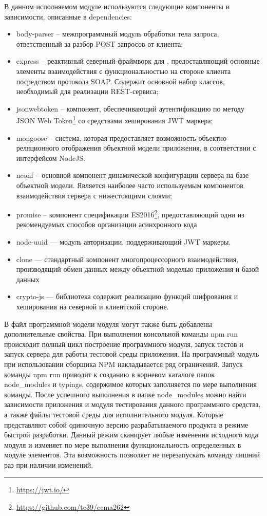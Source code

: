 В данном исполняемом модуле используются следующие компоненты и зависимости, описанные в dependencies:
\begin{itemize}
  \item body-parser – межпрограммный модуль обработки тела запроса, ответственный за разбор POST запросов от клиента;
  \item express – реактивный северный-фраймворк для \nodejs{}, предоставляющий основные элементы взаимодействия с функциональностью на стороне клиента посредством протокола SOAP. Содержит основной набор классов, необходимый для реализации REST-сервиса;
  \item jsonwebtoken – компонент, обеспечивающий аутентификацию по методу JSON Web Token\footnote{\url{https://jwt.io/}} со средствами хеширования JWT маркера;
  \item mongoose – система, которая предоставляет возможность объектно-реляционного отображения объектной модели приложения, в соответствии с интерфейсом NodeJS.
  \item nconf – основной компонент динамической конфигурации сервера на базе объектной модели. Является наиболее часто используемым компонентов взаимодействия сервера с нижестоящими слоями;
  \item promise – компонент спецификации ES2016\footnote{\url{https://github.com/tc39/ecma262}}, предоставляющий одни из рекомендуемых способов организации асинхронного кода
  \item node-uuid — модуль авторизации, поддерживающий JWT маркеры.
  \item clone — стандартный компонент многопроцессорного взаимодействия, производящий обмен данных между объектной моделью приложения и базой данных
  \item crypto-js — библиотека содержит реализацию функций шифрования и хеширования на северной и клиентской стороне.
\end{itemize}

В файл программной модели модуля могут также быть добавлены дополнительные свойства. При выполнении консольной команды npm run происходит полный цикл построение программного модуля, запуск тестов и запуск сервера \nodejs{} для работы тестовой среды приложения.
На программный модуль при использовании сборщика NPM накладывается ряд ограничений. Запуск команды npm run приводит к созданию в корневом каталоге папок node\_modules и typings, содержимое которых заполняется по мере выполнения команды. После успешного выполнения в папке node\_modules можно найти зависимости приложения и модуля тестирования данного программного средства, а также файлы тестовой среды для исполнительного модуля. Которые представляют собой одиночную версию разрабатываемого продукта в режиме быстрой разработки. Данный режим сканирует любые изменения исходного кода модуля и изменяет по мере выполнения функциональность определенных в модуле элементов. Эта возможность позволяет не перезапускать команду лишний раз при наличии изменений.

